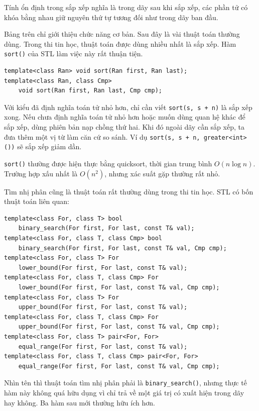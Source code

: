 \documentclass[11pt]{article}
\begin{document}
Tính ổn định trong sắp xếp nghĩa là trong dãy sau khi sắp xếp, các phần tử có
khóa bằng nhau giữ nguyên thứ tự tương đối như trong dãy ban đầu.

Bảng trên chỉ giới thiệu chức năng cơ bản. Sau đây là vài thuật toán thường
dùng. Trong thi tin học, thuật toán được dùng nhiều nhất là sắp xếp. Hàm
\verb|sort()| của STL làm việc này rất thuận tiện.

\begin{verbatim}
template<class Ran> void sort(Ran first, Ran last);
template<class Ran, class Cmp>
    void sort(Ran first, Ran last, Cmp cmp);
\end{verbatim}

Với kiểu đã định nghĩa toán tử nhỏ hơn, chỉ cần viết \verb|sort(s, s + n)| là
sắp xếp xong. Nếu chưa định nghĩa toán tử nhỏ hơn hoặc muốn dùng quan hệ khác
để sắp xếp, dùng phiên bản nạp chồng thứ hai. Khi đó ngoài dãy cần sắp xếp,
ta đưa thêm một vị từ làm căn cứ so sánh. Ví dụ
\verb|sort(s, s + n, greater<int>())| sẽ sắp xếp giảm dần.

\verb|sort()| thường được hiện thực bằng quicksort, thời gian trung bình
\(O(n\log n)\). Trường hợp xấu nhất là \(O(n^2)\), nhưng xác suất gặp thường
rất nhỏ.

Tìm nhị phân cũng là thuật toán rất thường dùng trong thi tin học. STL có bốn
thuật toán liên quan:

\begin{verbatim}
template<class For, class T> bool
    binary_search(For first, For last, const T& val);
template<class For, class T, class Cmp> bool
    binary_search(For first, For last, const T& val, Cmp cmp);
template<class For, class T> For
    lower_bound(For first, For last, const T& val);
template<class For, class T, class Cmp> For
    lower_bound(For first, For last, const T& val, Cmp cmp);
template<class For, class T> For
    upper_bound(For first, For last, const T& val);
template<class For, class T, class Cmp> For
    upper_bound(For first, For last, const T& val, Cmp cmp);
template<class For, class T> pair<For, For>
    equal_range(For first, For last, const T& val);
template<class For, class T, class Cmp> pair<For, For>
    equal_range(For first, For last, const T& val, Cmp cmp);
\end{verbatim}

Nhìn tên thì thuật toán tìm nhị phân phải là \verb|binary_search()|, nhưng
thực tế hàm này không quá hữu dụng vì chỉ trả về một giá trị có xuất hiện
trong dãy hay không. Ba hàm sau mới thường hữu ích hơn.
\end{document}
